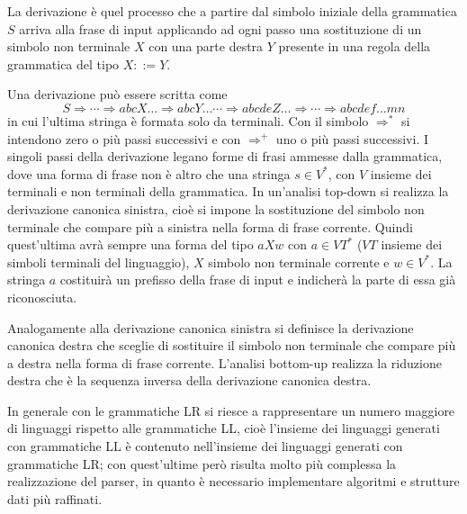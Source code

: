 La derivazione è quel processo che a partire dal simbolo iniziale della
grammatica $S$ arriva alla frase di input applicando ad ogni passo una
sostituzione di un simbolo non terminale $X$ con una parte destra $Y$ presente in
una regola della grammatica del tipo $X ::= Y$. 

Una derivazione può essere scritta come 
$$ S \Rightarrow \cdots \Rightarrow
abcX\ldots \Rightarrow abcY\ldots \cdots \Rightarrow abcdeZ\ldots \Rightarrow
\cdots \Rightarrow abcdef\ldots mn $$ 
in cui l'ultima stringa è formata solo da
terminali. Con il simbolo $ \Rightarrow^*$ si intendono zero o più passi
successivi e con $\Rightarrow^+$ uno o più passi successivi. I singoli passi
della derivazione legano forme di frasi ammesse dalla grammatica, dove una forma
di frase non è altro che una stringa $s \in V^*$, con $V$ insieme dei terminali e
non terminali della grammatica. In un'analisi top-down si realizza la
derivazione canonica sinistra, cioè si impone la sostituzione del simbolo
non terminale che compare più a sinistra nella forma di frase corrente. Quindi
quest'ultima avrà sempre una forma del tipo $aXw$ con $a \in VT^*$ ($VT$ insieme
dei simboli terminali del linguaggio), $X$ simbolo non terminale corrente e $w
\in V^*$. La stringa $a$ costituirà un prefisso della frase di input e
indicherà la parte di essa già riconosciuta. 

Analogamente alla derivazione canonica sinistra si definisce la derivazione
canonica destra che sceglie di sostituire il simbolo non terminale che
compare più a destra nella forma di frase corrente. L'analisi bottom-up realizza
la riduzione destra che è la sequenza inversa della derivazione canonica destra.

In generale con le grammatiche LR si riesce a rappresentare un numero
maggiore di linguaggi rispetto alle grammatiche LL, cioè l'insieme dei
linguaggi generati con grammatiche LL è contenuto nell'insieme dei linguaggi
generati con grammatiche LR; con quest'ultime però risulta molto più complessa
la realizzazione del parser, in quanto è necessario implementare algoritmi e
strutture dati più raffinati.

